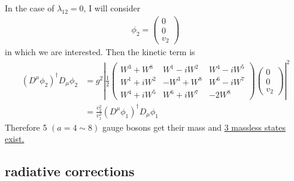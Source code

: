 In the case of $\lambda_{12}=0$, I will consider
\begin{align*}
    \phi_2=\begin{pmatrix}
        0\\0\\v_2
    \end{pmatrix}
\end{align*}
in which we are interested. Then the kinetic term is
\begin{align*}
    (D^{\mu}\phi_2)^{\dag}D_{\mu}\phi_2&=g^2\left|\frac{1}{2}\begin{pmatrix}
        W^3+W^8&W^1-iW^2&W^4-iW^5\\
        W^1+iW^2&-W^3+W^8&W^6-iW^7\\
        W^4+iW^5&W^6+iW^7&-2W^8
    \end{pmatrix}\begin{pmatrix}
        0\\0\\v_2
    \end{pmatrix}\right|^2\\
    &=\frac{v_2^2}{v_1^2}(D^{\mu}\phi_1)^{\dag}D_{\mu}\phi_1
\end{align*}
Therefore 5 $(a=4\sim8)$ gauge bosons get their mass and \underline{3 massless states exist.}

\subsection{radiative corrections}
